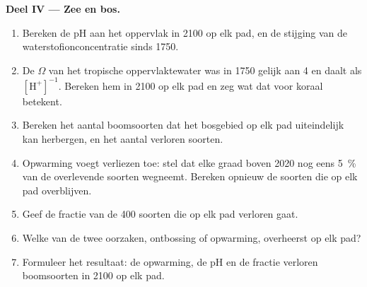 \begin{problem}
\medskip
\noindent\textbf{Deel IV --- Zee en bos.}
\begin{enumerate}[resume]
  \item Bereken de pH aan het oppervlak in 2100 op elk pad, en de stijging
        van de waterstofionconcentratie sinds 1750.
  \item De  $\Omega$ van het tropische oppervlaktewater was
        in 1750 gelijk aan 4 en daalt als $[\ensuremath{\mathrm{H^{+}}}]^{-1}$. Bereken hem in 2100
        op elk pad en zeg wat dat voor koraal betekent.
  \item Bereken het aantal boomsoorten dat het bosgebied op elk pad
        uiteindelijk kan herbergen, en het aantal verloren soorten.
  \item Opwarming voegt verliezen toe: stel dat elke graad boven 2020 nog eens
        \qty{5}{\%} van de overlevende soorten wegneemt. Bereken opnieuw
        de soorten die op elk pad overblijven.
  \item Geef de fractie van de 400 soorten die op elk pad verloren gaat.
  \item Welke van de twee oorzaken, ontbossing of opwarming, overheerst op
        elk pad?
  \item Formuleer het resultaat: de opwarming, de pH en de fractie
        verloren boomsoorten in 2100 op elk pad.
\end{enumerate}
\end{problem}

